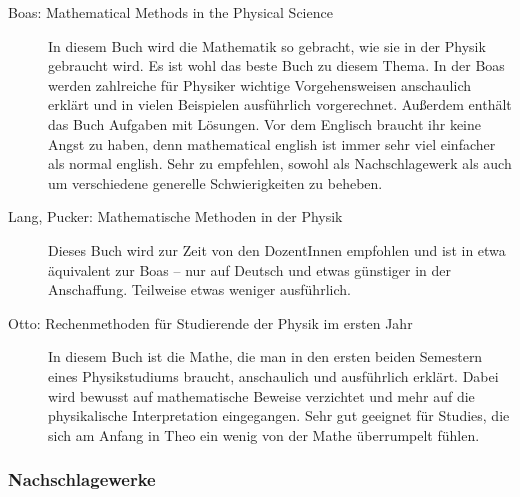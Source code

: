 \begin{description}

\item[Boas: Mathematical Methods in the Physical Science]{
		In diesem Buch wird die Mathematik so gebracht, wie sie in der Physik gebraucht wird. Es ist wohl das beste Buch zu diesem Thema. In der Boas werden zahlreiche für Physiker wichtige Vorgehensweisen anschaulich erklärt und in vielen Beispielen ausführlich vorgerechnet. Außerdem enthält das Buch Aufgaben mit Lösungen. Vor dem Englisch braucht ihr keine Angst zu haben, denn mathematical english ist immer sehr viel einfacher als normal english. Sehr zu empfehlen, sowohl als Nachschlagewerk als auch um verschiedene generelle Schwierigkeiten zu beheben.}

\item[Lang, Pucker: Mathematische Methoden in der Physik]{
		Dieses Buch wird zur Zeit von den DozentInnen empfohlen und ist in etwa äquivalent zur Boas -- nur auf Deutsch und etwas günstiger in der Anschaffung. Teilweise etwas weniger ausführlich.}



\item[Otto: Rechenmethoden für Studierende der Physik im ersten Jahr]{
		In diesem Buch ist die Mathe, die man in den ersten beiden Semestern eines Physikstudiums braucht, anschaulich und ausführlich erklärt. Dabei wird bewusst auf mathematische Beweise verzichtet und mehr auf die physikalische Interpretation eingegangen. Sehr gut geeignet für Studies, die sich am Anfang in Theo ein wenig von der Mathe überrumpelt fühlen.}
\end{description}

\subsubsection*{Nachschlagewerke}

